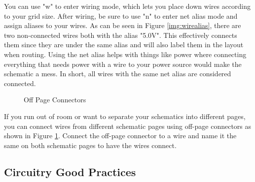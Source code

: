 You can use "w" to enter wiring mode, which lets you place down wires according to your grid size. After wiring, be sure to use
"n" to enter net alias mode and assign aliases to your wires. As can be seen in Figure \ref{img:wirealias}, there are two
non-connected wires both with the alias "5.0V". This effectively connects them since they are under the same alias and will also
label them in the layout when routing. Using the net alias helps with things like power where connecting everything that needs
power with a wire to your power source would make the schematic a mess. In short, all wires with the same net alias are considered
connected.

\begin{figure}[H]
  \centering
\caption{Off Page Connectors}
\label{img:offpageconn}
\end{figure}

If you run out of room or want to separate your schematics into different pages, you can connect wires from different schematic
pages using off-page connectors as shown in Figure \ref{img:offpageconn}. Connect the off-page connector to a wire and name it
the same on both schematic pages to have the wires connect.

\subsection{Circuitry Good Practices}
